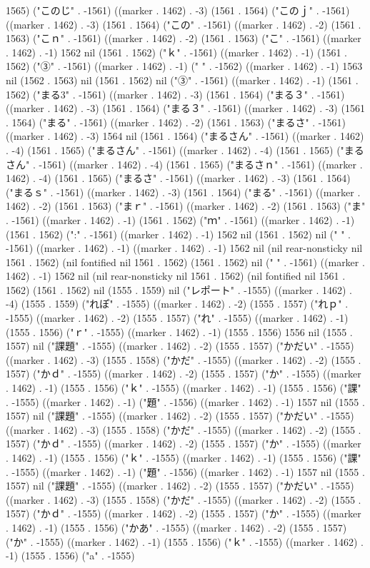 1565) ("このじ" . -1561) ((marker . 1462) . -3) (1561 . 1564) ("このｊ" . -1561) ((marker . 1462) . -3) (1561 . 1564) ("この" . -1561) ((marker . 1462) . -2) (1561 . 1563) ("こｎ" . -1561) ((marker . 1462) . -2) (1561 . 1563) ("こ" . -1561) ((marker . 1462) . -1) 1562 nil (1561 . 1562) ("ｋ" . -1561) ((marker . 1462) . -1) (1561 . 1562) ("③" . -1561) ((marker . 1462) . -1) ("
" . -1562) ((marker . 1462) . -1) 1563 nil (1562 . 1563) nil (1561 . 1562) nil ("③" . -1561) ((marker . 1462) . -1) (1561 . 1562) ("まる3" . -1561) ((marker . 1462) . -3) (1561 . 1564) ("まる３" . -1561) ((marker . 1462) . -3) (1561 . 1564) ("まる３" . -1561) ((marker . 1462) . -3) (1561 . 1564) ("まる" . -1561) ((marker . 1462) . -2) (1561 . 1563) ("まるさ" . -1561) ((marker . 1462) . -3) 1564 nil (1561 . 1564) ("まるさん" . -1561) ((marker . 1462) . -4) (1561 . 1565) ("まるさん" . -1561) ((marker . 1462) . -4) (1561 . 1565) ("まるさん" . -1561) ((marker . 1462) . -4) (1561 . 1565) ("まるさｎ" . -1561) ((marker . 1462) . -4) (1561 . 1565) ("まるさ" . -1561) ((marker . 1462) . -3) (1561 . 1564) ("まるｓ" . -1561) ((marker . 1462) . -3) (1561 . 1564) ("まる" . -1561) ((marker . 1462) . -2) (1561 . 1563) ("まｒ" . -1561) ((marker . 1462) . -2) (1561 . 1563) ("ま" . -1561) ((marker . 1462) . -1) (1561 . 1562) ("ｍ" . -1561) ((marker . 1462) . -1) (1561 . 1562) (":" . -1561) ((marker . 1462) . -1) 1562 nil (1561 . 1562) nil (" " . -1561) ((marker . 1462) . -1) ((marker . 1462) . -1) 1562 nil (nil rear-nonsticky nil 1561 . 1562) (nil fontified nil 1561 . 1562) (1561 . 1562) nil (" " . -1561) ((marker . 1462) . -1) 1562 nil (nil rear-nonsticky nil 1561 . 1562) (nil fontified nil 1561 . 1562) (1561 . 1562) nil (1555 . 1559) nil ("レポート" . -1555) ((marker . 1462) . -4) (1555 . 1559) ("れぽ" . -1555) ((marker . 1462) . -2) (1555 . 1557) ("れｐ" . -1555) ((marker . 1462) . -2) (1555 . 1557) ("れ" . -1555) ((marker . 1462) . -1) (1555 . 1556) ("ｒ" . -1555) ((marker . 1462) . -1) (1555 . 1556) 1556 nil (1555 . 1557) nil ("課題" . -1555) ((marker . 1462) . -2) (1555 . 1557) ("かだい" . -1555) ((marker . 1462) . -3) (1555 . 1558) ("かだ" . -1555) ((marker . 1462) . -2) (1555 . 1557) ("かｄ" . -1555) ((marker . 1462) . -2) (1555 . 1557) ("か" . -1555) ((marker . 1462) . -1) (1555 . 1556) ("ｋ" . -1555) ((marker . 1462) . -1) (1555 . 1556) ("課" . -1555) ((marker . 1462) . -1) ("題" . -1556) ((marker . 1462) . -1) 1557 nil (1555 . 1557) nil ("課題" . -1555) ((marker . 1462) . -2) (1555 . 1557) ("かだい" . -1555) ((marker . 1462) . -3) (1555 . 1558) ("かだ" . -1555) ((marker . 1462) . -2) (1555 . 1557) ("かｄ" . -1555) ((marker . 1462) . -2) (1555 . 1557) ("か" . -1555) ((marker . 1462) . -1) (1555 . 1556) ("ｋ" . -1555) ((marker . 1462) . -1) (1555 . 1556) ("課" . -1555) ((marker . 1462) . -1) ("題" . -1556) ((marker . 1462) . -1) 1557 nil (1555 . 1557) nil ("課題" . -1555) ((marker . 1462) . -2) (1555 . 1557) ("かだい" . -1555) ((marker . 1462) . -3) (1555 . 1558) ("かだ" . -1555) ((marker . 1462) . -2) (1555 . 1557) ("かｄ" . -1555) ((marker . 1462) . -2) (1555 . 1557) ("か" . -1555) ((marker . 1462) . -1) (1555 . 1556) ("かあ" . -1555) ((marker . 1462) . -2) (1555 . 1557) ("か" . -1555) ((marker . 1462) . -1) (1555 . 1556) ("ｋ" . -1555) ((marker . 1462) . -1) (1555 . 1556) ("a" . -1555) 